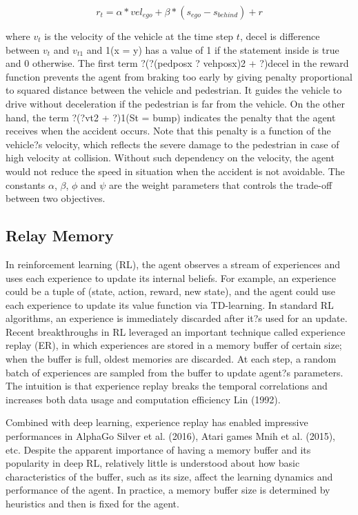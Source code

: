 \begin{equation} \label{eq:reward-func}
r_t = \alpha * vel_{ego} + \beta * (s_{ego} - s_{behind}) + r
\end{equation}

where $v_t$ is the velocity of the vehicle at the time step $t$, decel is difference between $v_t$ and $v_{t1}$ and 1(x = y) has a value of 1 if the statement inside is true and 0 otherwise. The first term ?(?(pedposx ? vehposx)2 + ?)decel in the reward function prevents the agent from braking too early by giving penalty proportional to squared distance between the vehicle and pedestrian. It guides the vehicle to drive without deceleration if the pedestrian is far from the vehicle. On the other hand, the term ?(?vt2 + ?)1(St = bump) indicates the penalty that the agent receives when the accident occurs. Note that this penalty is a function of the vehicle?s velocity, which reflects the severe damage to the pedestrian in case of high velocity at collision. Without such dependency on the velocity, the agent would not reduce the speed in situation when the accident is not avoidable. The constants $\alpha$, $\beta$, $\phi$ and $\psi$ are the weight parameters that controls the trade-off between two objectives.

\subsection{Relay Memory}

In reinforcement learning (RL), the agent observes a stream of experiences and uses each experience to update its internal beliefs. For example, an experience could be a tuple of (state, action, reward, new state), and the agent could use each experience to update its value function via TD-learning. In standard RL algorithms, an experience is immediately discarded after it?s used for an update. Recent breakthroughs in RL leveraged an important technique called experience replay (ER), in which experiences are stored in a memory buffer of certain size; when the buffer is full, oldest memories are discarded. At each step, a random batch of experiences are sampled from the buffer to update agent?s parameters. The intuition is that experience replay breaks the temporal correlations and increases both data usage and computation efficiency Lin (1992).

Combined with deep learning, experience replay has enabled impressive performances in AlphaGo Silver et al. (2016), Atari games Mnih et al. (2015), etc. Despite the apparent importance of having a memory buffer and its popularity in deep RL, relatively little is understood about how basic characteristics of the buffer, such as its size, affect the learning dynamics and performance of the agent. In practice, a memory buffer size is determined by heuristics and then is fixed for the agent.

